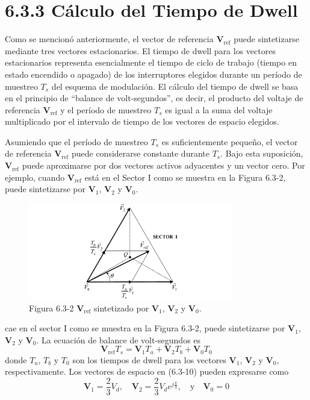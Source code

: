 \documentclass[letterpaper,12pt]{article}
\begin{document}
\section*{6.3.3 Cálculo del Tiempo de Dwell}
    
Como se mencionó anteriormente, el vector de referencia \( \mathbf{V}_{\text{ref}} \) puede sintetizarse mediante tres vectores estacionarios. El tiempo de dwell para los vectores estacionarios representa esencialmente el tiempo de ciclo de trabajo (tiempo en estado encendido o apagado) de los interruptores elegidos durante un período de muestreo $T_s$ del esquema de modulación. El cálculo del tiempo de dwell se basa en el principio de ``balance de volt-segundos'', es decir, el producto del voltaje de referencia \( \mathbf{V}_{\text{ref}} \) y el período de muestreo $T_s$ es igual a la suma del voltaje multiplicado por el intervalo de tiempo de los vectores de espacio elegidos.
    
Asumiendo que el período de muestreo $T_s$ es suficientemente pequeño, el vector de referencia \( \mathbf{V}_{\text{ref}} \) puede considerarse constante durante $T_s$. Bajo esta suposición, \( \mathbf{V}_{\text{ref}} \) puede aproximarse por dos vectores activos adyacentes y un vector cero. Por ejemplo, cuando \( \mathbf{V}_{\text{ref}} \) está en el Sector I como se muestra en la Figura 6.3-2, puede sintetizarse por \( \mathbf{V}_1 \), \( \mathbf{V}_2 \) y \( \mathbf{V}_0 \).
    
\begin{figure}[h]
    \centering
    \includegraphics[width=0.8\textwidth]{graficos/img113.jpg}
    \caption{Figura 6.3-2 \( \mathbf{V}_{\text{ref}} \) sintetizado por \( \mathbf{V}_1 \), \( \mathbf{V}_2 \) y \( \mathbf{V}_0 \).}
    \label{fig:sintesis_vectores_espacio}
\end{figure}
\FloatBarrier
    
cae en el sector I como se muestra en la Figura 6.3-2, puede sintetizarse por \( \mathbf{V}_1 \), \( \mathbf{V}_2 \) y \( \mathbf{V}_0 \). La ecuación de balance de volt-segundos es
\[
\mathbf{V}_{\text{ref}} T_s = \mathbf{V}_1 T_a + \mathbf{V}_2 T_b + \mathbf{V}_0 T_0 \tag{6.3-10}
\]
donde \( T_a \), \( T_b \) y \( T_0 \) son los tiempos de dwell para los vectores \( \mathbf{V}_1 \), \( \mathbf{V}_2 \) y \( \mathbf{V}_0 \), respectivamente. Los vectores de espacio en (6.3-10) pueden expresarse como
\[
\mathbf{V}_1 = \frac{2}{3} V_d, \quad \mathbf{V}_2 = \frac{2}{3} V_d e^{j\frac{\pi}{3}}, \quad \text{y} \quad \mathbf{V}_0 = 0 \tag{6.3-11}
\]
    
\end{document}
